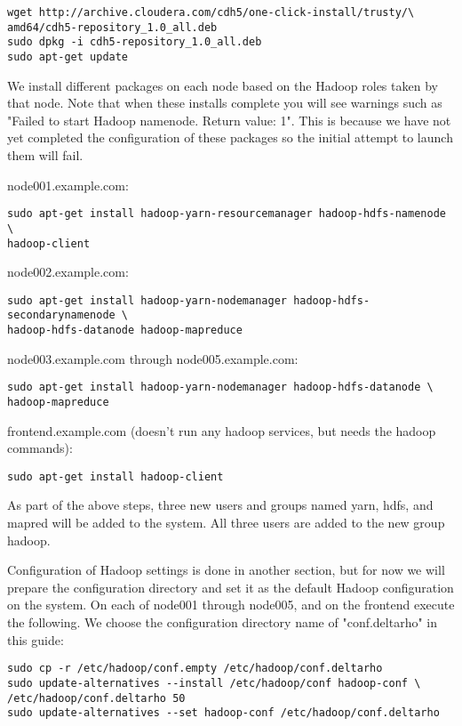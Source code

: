 \begin{verbatim}
wget http://archive.cloudera.com/cdh5/one-click-install/trusty/\
amd64/cdh5-repository_1.0_all.deb
sudo dpkg -i cdh5-repository_1.0_all.deb
sudo apt-get update
\end{verbatim}

We install different packages on each node based on the Hadoop roles
taken by that node.  Note that when these installs complete you will see
warnings such as "Failed to start Hadoop namenode. Return value: 1".
This is because we have not yet completed the configuration of these
packages so the initial attempt to launch them will fail.

node001.example.com:
\begin{verbatim}
sudo apt-get install hadoop-yarn-resourcemanager hadoop-hdfs-namenode \
hadoop-client
\end{verbatim}

node002.example.com:
\begin{verbatim}
sudo apt-get install hadoop-yarn-nodemanager hadoop-hdfs-secondarynamenode \
hadoop-hdfs-datanode hadoop-mapreduce
\end{verbatim}

node003.example.com through node005.example.com:
\begin{verbatim}
sudo apt-get install hadoop-yarn-nodemanager hadoop-hdfs-datanode \
hadoop-mapreduce
\end{verbatim}

frontend.example.com (doesn't run any hadoop services, but needs the hadoop commands):
\begin{verbatim}
sudo apt-get install hadoop-client
\end{verbatim}

As part of the above steps, three new users and groups named yarn, hdfs,
and mapred will be added to the system.  All three users are added to
the new group hadoop.

Configuration of Hadoop settings is done in another section, but for now
we will prepare the configuration directory and set it as the default
Hadoop configuration on the system.  On each of node001 through node005,
and on the frontend execute the following.  We choose the configuration
directory name of "conf.deltarho" in this guide:

\begin{verbatim}
sudo cp -r /etc/hadoop/conf.empty /etc/hadoop/conf.deltarho
sudo update-alternatives --install /etc/hadoop/conf hadoop-conf \
/etc/hadoop/conf.deltarho 50
sudo update-alternatives --set hadoop-conf /etc/hadoop/conf.deltarho
\end{verbatim}


